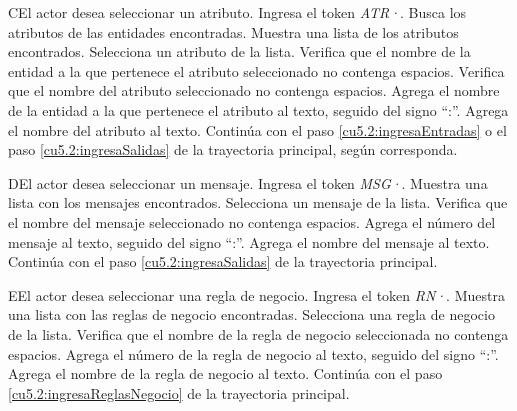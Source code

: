  \begin{UCtrayectoriaA}{C}{El actor desea seleccionar un atributo.}
 	\UCpaso[\UCactor] Ingresa el token {\it ATR·}.
  	\UCpaso[\UCsist] Busca los atributos de las entidades encontradas.
  	\UCpaso[\UCsist] Muestra una lista de los atributos encontrados.
 	\UCpaso[\UCactor] Selecciona un atributo de la lista.
  	\UCpaso[\UCsist] Verifica que el nombre de la entidad a la que pertenece el atributo seleccionado no contenga espacios. 
  	\UCpaso[\UCsist] Verifica que el nombre del atributo seleccionado no contenga espacios. 
  	\UCpaso[\UCsist] Agrega el nombre de la entidad a la que pertenece el atributo al texto, seguido del signo ``:''.
  	\UCpaso[\UCsist] Agrega el nombre del atributo al texto.
    \UCpaso[] Continúa con el paso \ref{cu5.2:ingresaEntradas} o el paso \ref{cu5.2:ingresaSalidas} de la trayectoria principal, según corresponda.
 \end{UCtrayectoriaA}
 \begin{UCtrayectoriaA}{D}{El actor desea seleccionar un mensaje.}
 	 \UCpaso[\UCactor] Ingresa el token {\it MSG·}.	
 	\UCpaso[\UCsist] Muestra una lista con los mensajes encontrados.
 	\UCpaso[\UCactor] Selecciona un mensaje de la lista.
  	\UCpaso[\UCsist] Verifica que el nombre del mensaje seleccionado no contenga espacios. 
  	\UCpaso[\UCsist] Agrega el número del mensaje al texto, seguido del signo ``:''.
  	\UCpaso[\UCsist] Agrega el nombre del mensaje al texto.
    \UCpaso[] Continúa con el paso \ref{cu5.2:ingresaSalidas} de la trayectoria principal.
 \end{UCtrayectoriaA}
 \begin{UCtrayectoriaA}{E}{El actor desea seleccionar una regla de negocio.}
 	\UCpaso[\UCactor] Ingresa el token {\it RN·}.	
 	\UCpaso[\UCsist] Muestra una lista con las reglas de negocio encontradas.
 	\UCpaso[\UCactor] Selecciona una regla de negocio de la lista.
  	\UCpaso[\UCsist] Verifica que el nombre de la regla de negocio seleccionada no contenga espacios. 
  	\UCpaso[\UCsist] Agrega el número de la regla de negocio al texto, seguido del signo ``:''.
  	\UCpaso[\UCsist] Agrega el nombre de la regla de negocio al texto.
    \UCpaso[] Continúa con el paso \ref{cu5.2:ingresaReglasNegocio} de la trayectoria principal.
 \end{UCtrayectoriaA}
